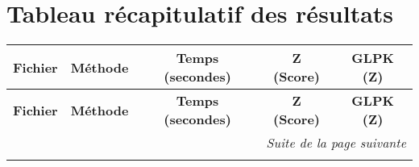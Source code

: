 \begin{minipage}
\section{Tableau récapitulatif des résultats}

\begin{longtable}{|l|l|c|c|c|}
\hline
\textbf{Fichier} & \textbf{Méthode} & \textbf{Temps (secondes)} & \textbf{Z (Score)} & \textbf{GLPK (Z)} \\
\hline
\endfirsthead

\hline
\textbf{Fichier} & \textbf{Méthode} & \textbf{Temps (secondes)} & \textbf{Z (Score)} & \textbf{GLPK (Z)} \\
\hline
\endhead

\hline
\multicolumn{5}{|r|}{\textit{Suite de la page suivante}} \\
\hline
\endfoot

\hline
\endlastfoot


\end{longtable}
\end{minipage}
